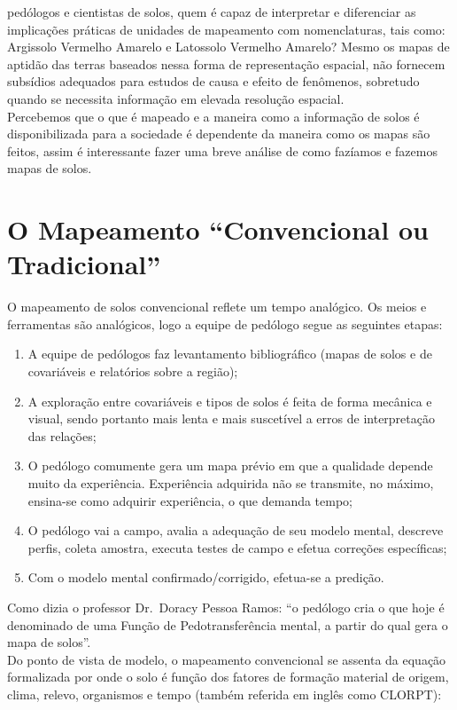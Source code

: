 pedólogos e cientistas de solos, quem é capaz de interpretar e diferenciar as implicações práticas de unidades de
mapeamento com nomenclaturas, tais como: Argissolo Vermelho Amarelo e Latossolo Vermelho Amarelo? Mesmo os mapas de aptidão das terras baseados nessa forma de representação espacial, não fornecem subsídios adequados para estudos de causa e efeito de fenômenos, sobretudo quando se necessita informação em elevada resolução espacial.\\
Percebemos que o que é mapeado e a maneira como a informação de solos é disponibilizada para a sociedade é dependente da maneira como os mapas são feitos, assim
é interessante fazer uma breve análise de como fazíamos e fazemos mapas de solos.
\section{O Mapeamento ``Convencional ou Tradicional''}
O mapeamento de solos convencional reflete um tempo analógico. Os meios e ferramentas são analógicos, logo a equipe de pedólogo segue as seguintes etapas:
\begin{enumerate}
\item A equipe de pedólogos faz levantamento bibliográfico (mapas de solos e de covariáveis e relatórios sobre a região);
\item A exploração entre covariáveis e tipos de solos é feita de forma mecânica e visual, sendo portanto mais lenta e mais suscetível a erros de interpretação das relações;
\item O pedólogo comumente gera um mapa prévio em que a qualidade depende muito da experiência. Experiência adquirida não se transmite, no máximo, ensina-se como adquirir experiência, o que demanda tempo;
\item O pedólogo vai a campo, avalia a adequação de seu modelo mental, descreve perfis, coleta amostra, executa testes de campo e efetua correções específicas;
\item Com o modelo mental confirmado/corrigido, efetua-se a predição.
\end{enumerate}
Como dizia o professor Dr.~Doracy Pessoa Ramos: ``o pedólogo cria o que hoje é denominado de uma Função de Pedotransferência mental, a partir do qual gera o mapa de solos''.\\
Do ponto de vista de modelo, o mapeamento convencional se assenta da equação formalizada por \cite{Jenny:1941} onde o solo é função dos fatores de formação material de origem, clima, relevo, organismos e tempo (também referida em inglês como CLORPT):\\
